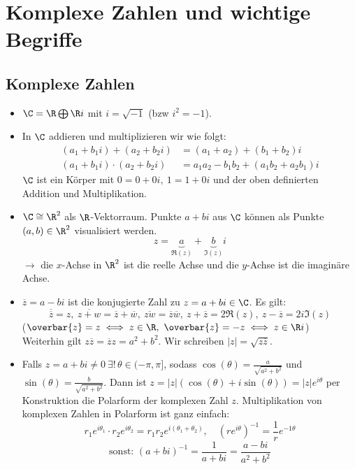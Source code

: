 \chapter[Einführung]{Komplexe Zahlen und wichtige Begriffe}\lecture

\section{Komplexe Zahlen}

\begin{itemize}
	\item $ \C = \R \bigoplus \R i $ mit $ i = \sqrt{-1} $ (bzw $ i^2 = -1 $). 
	
	\item In $\C$ addieren und multiplizieren wir wie folgt:
	\begin{align*}
	(a_1 + b_1i) + (a_2 + b_2i) &= (a_1 + a_2) + (b_1 + b_2)i\\
	(a_1 + b_1i) \cdot (a_2 + b_2i) &= a_1a_2 - b_1b_2 + (a_1b_2 + a_2b_1)i
	\end{align*}
	$\C$ ist ein Körper mit $ 0 = 0+0i,\ 1 = 1+0i $ und der oben definierten Addition und Multiplikation.
	
	\item $ \C \cong \R^2 $ als $\R$-Vektorraum. Punkte $ a+bi $ aus $\C$ können als Punkte $ (a,b) \in \R^2 $ visualisiert werden.
	\[ z= \underbrace{a}_{\Re(z)} + \underbrace{b}_{\Im(z)}i \]
	$ \rightarrow $ die $x$-Achse in $\R^2$ ist die reelle Achse und die $y$-Achse ist die imaginäre Achse.
	
	\item $ \overbar{z} = a-bi $ ist die konjugierte Zahl zu $ z = a+bi \in \C $. Es gilt:
	\[ \overbar{\overbar{z}} = z,\ \overbar{z+w} = \overbar{z} + \overbar{w},\ \overbar{zw} = \overbar{z} \overbar{w},\ z + \overbar{z} = 2\Re(z),\ z - \overbar{z} = 2i\Im(z) \]
	($ \overbar{z} = z \iff z \in \R,\ \overbar{z} = -z \iff z \in \R i $)\\
	Weiterhin gilt $ z \overbar{z} = \overbar{z} z = a^2 + b^2 $. Wir schreiben $ |z| = \sqrt{z \overbar{z}} $.
	
	\item Falls $ z = a+bi \neq 0\ \exists!\, \theta \in (-\pi,\pi] $, sodass $ \cos(\theta) = \frac{a}{\sqrt{a^2+b^2}} $ und $ \sin(\theta) = \frac{b}{\sqrt{a^2+b^2}}. $ Dann ist $ z = |z| (\cos(\theta) + i\sin(\theta)) = |z| e^{i \theta} $ per Konstruktion die Polarform der komplexen Zahl $z$. Multiplikation von komplexen Zahlen in Polarform ist ganz einfach:
	\[ r_1 e^{i\theta_1} \cdot r_2 e^{i\theta_2} = r_1r_2 e^{i(\theta_1 + \theta_2)},\quad \left( re^{i\theta} \right)^{-1} = \frac{1}{r} e^{-1\theta} \]
	\[ \text{sonst: } (a+bi)^{-1} = \frac{1}{a+bi} = \frac{a-bi}{a^2+b^2} \]
	

\end{itemize}
